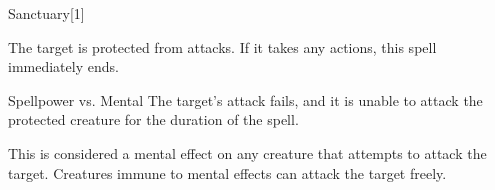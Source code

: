 
\begin{spellsection}{Sanctuary}[1]
    \begin{spellheader}
    \end{spellheader}
    \begin{spellcontent}
        \begin{spelltargetinginfo}
        \end{spelltargetinginfo}
        \begin{spelleffects}
            \spelleffect The target is protected from attacks. If it takes any actions, this spell immediately ends.
            \spelldur \durshort
        \end{spelleffects}
    \end{spellcontent}
    \begin{spellsubcontent}
        \begin{spelltargetinginfo}
        \end{spelltargetinginfo}
        \begin{spelleffects}
            \begin{spellattack}{Spellpower vs. Mental}
                \spellsuccess The target's attack fails, and it is unable to attack the protected creature for the duration of the spell.
            \end{spellattack}
        \end{spelleffects}
    \end{spellsubcontent}
    \begin{spellfooter}
        \spellnotes This is considered a mental effect on any creature that attempts to attack the target. Creatures immune to mental effects can attack the target freely.
        \miscastexplode
    \end{spellfooter}
\end{spellsection}

